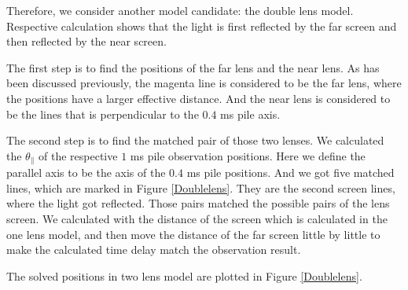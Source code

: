 \documentclass{emulateapj}
\begin{document}
Therefore, we consider another model candidate: the double lens model. Respective calculation shows that the light is first reflected by the far screen and then reflected by the near screen. 

The first step is to find the positions of the far lens and the near lens. As has been discussed previously, the magenta line is considered to be the far lens, where the positions have a larger effective distance. And the near lens is considered to be the lines that is perpendicular to the $0.4$ ms pile axis. 

The second step is to find the matched pair of those two lenses. We calculated the $\theta_{\parallel}$ of the respective $1$ ms pile observation positions. Here we define the parallel axis to be the axis of the $0.4$ ms pile positions. And we got five matched lines, which are marked in Figure \ref{Doublelens}. They are the second screen lines, where the light got reflected. Those pairs matched the possible pairs of the lens screen. We calculated with the distance of the screen which is calculated in the one lens model, and then move the distance of the far screen little by little to make the calculated time delay match the observation result.

The solved positions in two lens model are plotted in Figure \ref{Doublelens}.  



\end{document}
